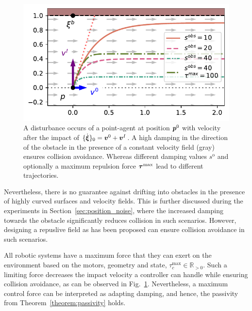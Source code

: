 \begin{figure}[htb]
\centering
  \centerline{\includegraphics[width=0.99\columnwidth]{figures/parallel_avoidance_obstacle}}
  \caption{A disturbance occurs of a point-agent at position $\boldsymbol{p}^0$ with velocity after the impact of $\{ \dot{\boldsymbol{\xi}} \}_0 = \boldsymbol{v}^0 + \boldsymbol{v}^I$. A high damping in the direction of the obstacle in the presence of a constant velocity field (gray) ensures collision avoidance. Whereas different damping values $s^{\mathrm{o}}$ and optionally a maximum repulsion force $\boldsymbol{\tau}^{\mathrm{max}}$ lead to different trajectories.}
  \label{fig:disturbance_with_parallel_velocity}
\end{figure}
    
Nevertheless, there is no guarantee against drifting into obstacles in the presence of highly curved surfaces and velocity fields. \iflong This is further discussed during the experiments in Section~\ref{sec:position_noise}, where the increased damping towards the obstacle significantly reduces collision in such scenarios. \fi However, designing a repuslive field as has been proposed \parencite{huber2023avoidance} can ensure collision avoidance in such scenarios.

\iflong
All robotic systems have a maximum force that they can exert on the environment based on the motors, geometry and state, $\tau_c^{\mathrm{max}} \in \mathbb{R}_{>0}$. Such a limiting force decreases the impact velocity a controller can handle while ensuring collision avoidance, as can be observed in Fig.~\ref{fig:disturbance_with_parallel_velocity}. Nevertheless, a maximum control force can be interpreted as adapting damping, and hence, the passivity from Theorem~\ref{theorem:passivity} holds.
\fi

